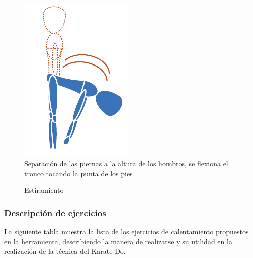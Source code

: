 \begin{figure}[H]
	\begin{center}
		\includegraphics[width=5.5cm, height=8cm]{./Figuras/Calentamiento/44_lab_Flexion_de_tronco_al_frente}\\
		Separación de las piernas a la altura de los hombros, se flexiona el tronco tocando la punta de los pies
	\end{center}
	\caption{Estiramiento}
	\label{fig:Musculos_Estiramiento3}
\end{figure}

\subsubsection{Descripción de ejercicios}
La siguiente tabla muestra la lista de los ejercicios de calentamiento propuestos en la herramienta, describiendo la manera de realizarse y su utilidad en la realización de la técnica del Karate Do.

